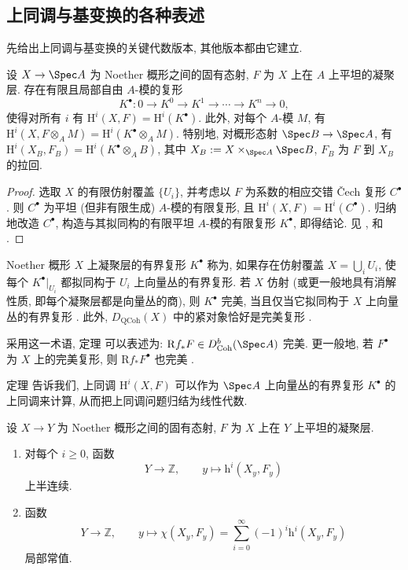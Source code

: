 \subsection{上同调与基变换的各种表述}\label{src:A.6.1-subsection}
先给出上同调与基变换的关键代数版本, 其他版本都由它建立.
\begin{theorem}[上同调与基变换 I]\label{src:A.6.2}
设 $X\to\Spec A$ 为 Noether 概形之间的固有态射, $F$ 为 $X$ 上在 $A$ 上平坦的凝聚层. 存在有限且局部自由 $A$-模的复形
\[
K^\bullet:0\longrightarrow K^0\longrightarrow K^1\longrightarrow\cdots\longrightarrow K^n\longrightarrow0,
\]
使得对所有 $i$ 有 $\mathrm H^i(X,F)=\mathrm H^i(K^\bullet)$. 此外, 对每个 $A$-模 $M$, 有 $\mathrm H^i(X,F\otimes_A M)=\mathrm H^i(K^\bullet\otimes_A M)$. 特别地, 对概形态射 $\Spec B\to\Spec A$, 有 $\mathrm H^i(X_B,F_B)=\mathrm H^i(K^\bullet\otimes_A B)$, 其中 $X_B:=X\times_{\Spec A}\Spec B$, $F_B$ 为 $F$ 到 $X_B$ 的拉回.
\end{theorem}
\begin{proof}
选取 $X$ 的有限仿射覆盖 $\{U_i\}$, 并考虑以 $F$ 为系数的相应交错 Čech 复形 $C^\bullet$. 则 $C^\bullet$ 为平坦 (但非有限生成) $A$-模的有限复形, 且 $\mathrm H^i(X,F)=\mathrm H^i(C^\bullet)$. 归纳地改造 $C^\bullet$, 构造与其拟同构的有限平坦 $A$-模的有限复形 $K^\bullet$, 即得结论. 见 \cite[第 $46$ 页的定理]{Mum70a}, \cite[Tag 07VK]{SP} 和 \cite[$28.2.1$]{Vak17}.
\end{proof}
\begin{remark}[完美复形]\label{src:A.6.3}
Noether 概形 $X$ 上凝聚层的有界复形 $K^\bullet$ 称为, 如果存在仿射覆盖 $X=\bigcup_i U_i$, 使每个 $K^\bullet|_{U_i}$ 都拟同构于 $U_i$ 上向量丛的有界复形. 若 $X$ 仿射 (或更一般地具有消解性质, 即每个凝聚层都是向量丛的商), 则 $K^\bullet$ 完美, 当且仅当它拟同构于 $X$ 上向量丛的有界复形 \cite[Tag 0F8F]{SP}. 此外, $D_{\mathrm{QCoh}}(X)$ 中的紧对象恰好是完美复形 \cite[Tag 09M8]{SP}.

采用这一术语, 定理  可以表述为: $\mathrm Rf_*F\in D_{\mathrm{Coh}}^b(\Spec A)$ 完美. 更一般地, 若 $F^\bullet$ 为 $X$ 上的完美复形, 则 $\mathrm Rf_*F^\bullet$ 也完美 \cite[Tag 0A1H]{SP}.
\end{remark}
定理  告诉我们, 上同调 $\mathrm H^i(X,F)$ 可以作为 $\Spec A$ 上向量丛的有界复形 $K^\bullet$ 的上同调来计算, 从而把上同调问题归结为线性代数.
\begin{theorem}[半连续性定理]\label{src:A.6.4}
设 $X\to Y$ 为 Noether 概形之间的固有态射, $F$ 为 $X$ 上在 $Y$ 上平坦的凝聚层.
\begin{enumerate}[(1)]
\item 对每个 $i\geq0$, 函数
\[
Y\longrightarrow\mathbb Z,\qquad y\longmapsto\mathrm h^i(X_y,F_y)
\]
上半连续.
\item 函数
\[
Y\longrightarrow\mathbb Z,\qquad y\longmapsto\chi(X_y,F_y)=\sum_{i=0}^\infty(-1)^i\mathrm h^i(X_y,F_y)
\]
局部常值.
\end{enumerate}
\end{theorem}
